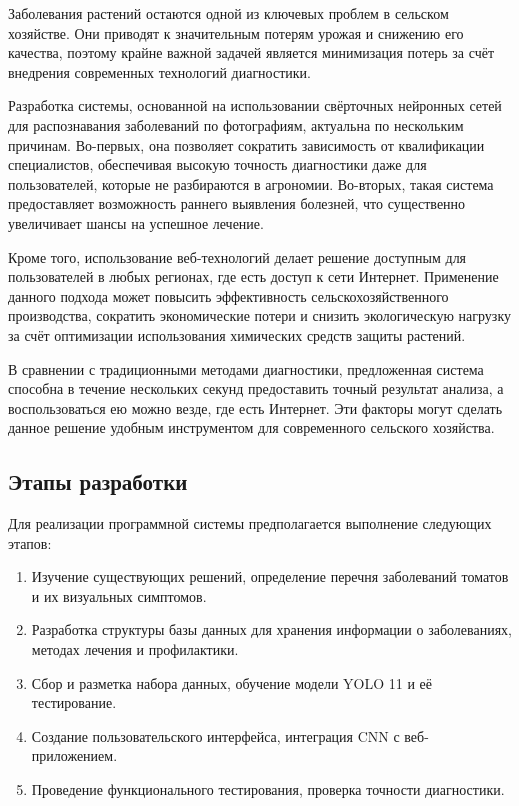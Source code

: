 Заболевания растений остаются одной из ключевых проблем в сельском хозяйстве. Они приводят к значительным потерям урожая и снижению его качества, поэтому крайне важной задачей является минимизация потерь за счёт внедрения современных технологий диагностики.

Разработка системы, основанной на использовании свёрточных нейронных сетей для распознавания заболеваний по фотографиям, актуальна по нескольким причинам. Во-первых, она позволяет сократить зависимость от квалификации специалистов, обеспечивая высокую точность диагностики даже для пользователей, которые не разбираются в агрономии. Во-вторых, такая система предоставляет возможность раннего выявления болезней, что существенно увеличивает шансы на успешное лечение. \cite{vkr3}

Кроме того, использование веб-технологий делает решение доступным для пользователей в любых регионах, где есть доступ к сети Интернет. Применение данного подхода может повысить эффективность сельскохозяйственного производства, сократить экономические потери и снизить экологическую нагрузку за счёт оптимизации использования химических средств защиты растений.

В сравнении с традиционными методами диагностики, предложенная система способна в течение нескольких секунд предоставить точный результат анализа, а воспользоваться ею можно везде, где есть Интернет. Эти факторы могут сделать данное решение удобным инструментом для современного сельского хозяйства.

\subsection{Этапы разработки}

Для реализации программной системы предполагается выполнение следующих этапов:
\begin{enumerate}
	\item Изучение существующих решений, определение перечня заболеваний томатов и их визуальных симптомов.
	\item Разработка структуры базы данных для хранения информации о заболеваниях, методах лечения и профилактики.
	\item Сбор и разметка набора данных, обучение модели YOLO 11 и её тестирование.
	\item Создание пользовательского интерфейса, интеграция CNN с веб-приложением.
	\item Проведение функционального тестирования, проверка точности диагностики.
\end{enumerate}

